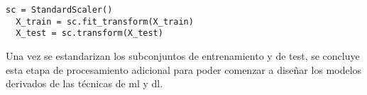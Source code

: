 \vspace{3mm}

\begin{lstlisting}[style=Python, caption={Estandarización de los subconjuntos}]
  sc = StandardScaler() 
  X_train = sc.fit_transform(X_train)
  X_test = sc.transform(X_test)
\end{lstlisting}

\vspace{3mm}

Una vez se estandarizan los subconjuntos de entrenamiento y de test, se concluye esta etapa de procesamiento adicional para poder comenzar a diseñar los modelos derivados de las técnicas de \gls{ml} y \gls{dl}.